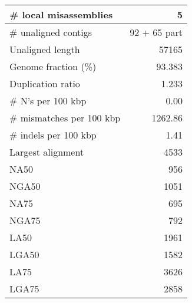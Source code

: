 \documentclass[12pt,a4paper]{article}
\begin{document}
\begin{table}[ht]
\begin{center}
\begin{tabular}{|l*{1}{|r}|}
\# local misassemblies & 5 \\ \hline
\# unaligned contigs & 92 + 65 part \\ \hline
Unaligned length & 57165 \\ \hline
Genome fraction (\%) & 93.383 \\ \hline
Duplication ratio & 1.233 \\ \hline
\# N's per 100 kbp & 0.00 \\ \hline
\# mismatches per 100 kbp & 1262.86 \\ \hline
\# indels per 100 kbp & 1.41 \\ \hline
Largest alignment & 4533 \\ \hline
NA50 & 956 \\ \hline
NGA50 & 1051 \\ \hline
NA75 & 695 \\ \hline
NGA75 & 792 \\ \hline
LA50 & 1961 \\ \hline
LGA50 & 1582 \\ \hline
LA75 & 3626 \\ \hline
LGA75 & 2858 \\ \hline
\end{tabular}
\end{center}
\end{table}
\end{document}
